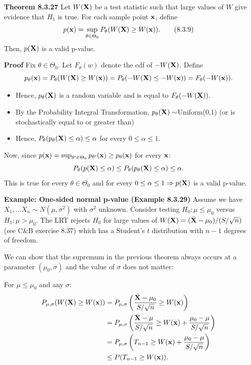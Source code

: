 \documentclass[11pt,]{article}
\def\bx{{\bf x}}
\def\bX{{\bf X}}
\def\bXbar{\bar{ \bX}}
\begin{document}
\noindent \textbf{Theorem 8.3.27} Let \(W(\bX)\) be a test statistic
such that large values of \(W\) give evidence that \(H_1\) is true. For
each sample point \(\bx\), define \begin{equation}
p(\bx) = \sup_{\theta\in\Theta_0} P_\theta (W(\bX) \geq W(\bx)). \tag{8.3.9}
\end{equation} Then, \(p(\bX)\) is a valid p-value.

\noindent \textbf{Proof} Fix \(\theta \in \Theta_0\). Let
\(F_\theta(w)\) denote the cdf of \(-W(\bX)\). Define
\[p_\theta(\bx) = P_\theta (W(\bX) \geq W(\bx)) = P_\theta(-W(\bX) \leq -W(\bx)) = F_\theta (-W(\bx)).\]

\begin{itemize}
\item Hence, $p_\theta (\bX)$ is a random variable and is equal to $F_\theta(-W(\bX))$.
\item By the Probability Integral Transformation, $p_\theta(\bX) \sim $Uniform(0,1) (or is stochastically equal to or greater than)
\item Hence, $P_\theta(p_\theta(\bX) \leq \alpha) \leq \alpha$ for every $0\leq \alpha \leq 1$.
\end{itemize}

Now, since
\(p(\bx) = \sup_{\theta^\prime \in \Theta_0} p_{\theta^\prime}(\bx) \geq p_\theta(\bx)\)
for every \(\bx\):
\[P_\theta(p(\bX) \leq \alpha) \leq P_\theta(p_\theta(\bX) \leq \alpha) \leq \alpha.\]
This is true for every \(\theta \in \Theta_0\) and for every
\(0\leq \alpha \leq 1 \Rightarrow p(\bX)\) is a valid p-value.

\noindent \textbf{Example: One-sided normal p-value (Example 8.3.29)}
Assume we have \(X_1,\ldots X_n \sim N(\mu,\sigma^2)\) with \(\sigma^2\)
unknown. Consider testing \(H_0: \mu \leq \mu_0\) versus
\(H_1: \mu > \mu_0\). The LRT rejects \(H_0\) for large values of
\(W(\bX) = (\bXbar - \mu_0)/(S/\sqrt{n})\) (see C\&B exercise 8.37)
which has a Student's \(t\) distribution with \(n-1\) degrees of
freedom.

We can show that the supremum in the previous theorem always occurs at a
parameter \((\mu_0, \sigma)\) and the value of \(\sigma\) does not
matter:

For \(\mu \leq \mu_0\) and any \(\sigma\): \begin{align*}
P_{\mu,\sigma}(W(\bX) \geq W(\bx)) &= P_{\mu,\sigma}\left(\frac{ \bXbar - \mu_0}{S/\sqrt{n}} \geq W(\bx)\right)\\
&= P_{\mu,\sigma}\left(\frac{ \bXbar - \mu}{S/\sqrt{n}} \geq W(\bx) + \frac{\mu_0 - \mu}{S/\sqrt{n}}\right)\\
&= P_{\mu,\sigma}\left(T_{n-1} \geq W(\bx)+ \frac{\mu_0 - \mu}{S/\sqrt{n}} \right)\\
&\leq P(T_{n-1} \geq W(\bx)).
\end{align*}
\end{document}
